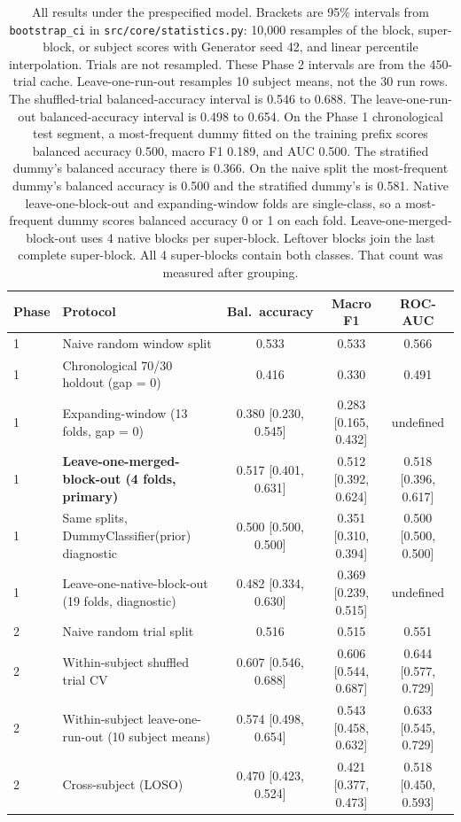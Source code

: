 \documentclass[11pt]{article}
\begin{document}
\begin{table}[h]
\centering
\scriptsize
\begin{tabular}{llccc}
\toprule
Phase & Protocol & Bal.\ accuracy & Macro F1 & ROC-AUC \\
\midrule
1 & Naive random window split & 0.533 & 0.533 & 0.566 \\
1 & Chronological 70/30 holdout (gap = 0) & 0.416 & 0.330 & 0.491 \\
1 & Expanding-window (13 folds, gap = 0) & 0.380 [0.230, 0.545] & 0.283 [0.165, 0.432] & undefined \\
1 & \textbf{Leave-one-merged-block-out (4 folds, primary)} & 0.517 [0.401, 0.631] & 0.512 [0.392, 0.624] & 0.518 [0.396, 0.617] \\
1 & Same splits, DummyClassifier(prior) diagnostic & 0.500 [0.500, 0.500] & 0.351 [0.310, 0.394] & 0.500 [0.500, 0.500] \\
1 & Leave-one-native-block-out (19 folds, diagnostic) & 0.482 [0.334, 0.630] & 0.369 [0.239, 0.515] & undefined \\
\midrule
2 & Naive random trial split & 0.516 & 0.515 & 0.551 \\
2 & Within-subject shuffled trial CV & 0.607 [0.546, 0.688] & 0.606 [0.544, 0.687] & 0.644 [0.577, 0.729] \\
2 & Within-subject leave-one-run-out (10 subject means) & 0.574 [0.498, 0.654] & 0.543 [0.458, 0.632] & 0.633 [0.545, 0.729] \\
2 & Cross-subject (LOSO) & 0.470 [0.423, 0.524] & 0.421 [0.377, 0.473] & 0.518 [0.450, 0.593] \\
\bottomrule
\end{tabular}
\caption{All results under the prespecified model. Brackets are 95\% intervals from \texttt{bootstrap\_ci} in \texttt{src/core/statistics.py}: 10{,}000 resamples of the block, super-block, or subject scores with Generator seed 42, and linear percentile interpolation. Trials are not resampled. These Phase 2 intervals are from the 450-trial cache. Leave-one-run-out resamples 10 subject means, not the 30 run rows. The shuffled-trial balanced-accuracy interval is 0.546 to 0.688. The leave-one-run-out balanced-accuracy interval is 0.498 to 0.654. On the Phase 1 chronological test segment, a most-frequent dummy fitted on the training prefix scores balanced accuracy 0.500, macro F1 0.189, and AUC 0.500. The stratified dummy's balanced accuracy there is 0.366. On the naive split the most-frequent dummy's balanced accuracy is 0.500 and the stratified dummy's is 0.581. Native leave-one-block-out and expanding-window folds are single-class, so a most-frequent dummy scores balanced accuracy 0 or 1 on each fold. Leave-one-merged-block-out uses 4 native blocks per super-block. Leftover blocks join the last complete super-block. All 4 super-blocks contain both classes. That count was measured after grouping.}
\label{tab:results}
\end{table}
\end{document}
